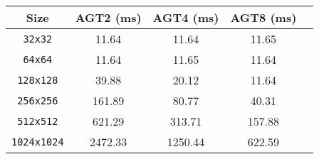 {\small
\begin{tabular}{|c|c|c|c|c|}
    \hline Size & AGT2 (ms) & AGT4 (ms) & AGT8 (ms) \\
    \hline \verb|32x32| & 11.64 & 11.64 & 11.65 \\ 
    \verb|64x64| & 11.64 & 11.65 & 11.64 \\
    \verb|128x128| & 39.88 & 20.12 & 11.64 \\
    \verb|256x256| & 161.89 & 80.77 & 40.31 \\
    \verb|512x512| & 621.29 & 313.71 & 157.88 \\
    \verb|1024x1024| & 2472.33 & 1250.44 & 622.59 \\
    \hline
\end{tabular}}